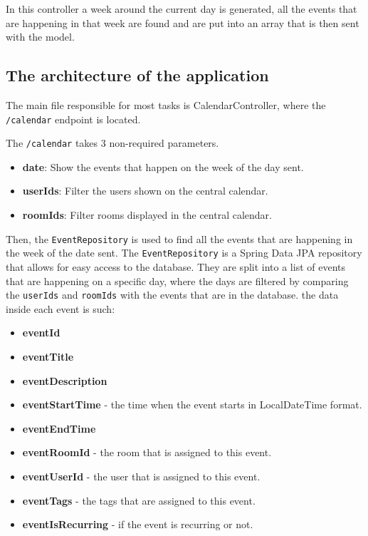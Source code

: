In this controller a week around the current day is generated, all the events that are happening in that week are found and are put into an array that is then sent with the model.




\newpage%

\subsection{The architecture of the application}\label{subsec:the-architecture-of-the-application}

The main file responsible for most tasks is CalendarController, where the \texttt{/calendar} endpoint is located.

The \texttt{/calendar} takes 3 non-required parameters.
\begin{itemize}
    \item \textbf{date}: Show the events that happen on the week of the day sent.
    \item \textbf{userIds}: Filter the users shown on the central calendar.
    \item \textbf{roomIds}: Filter rooms displayed in the central calendar.
\end{itemize}
Then, the \texttt{EventRepository} is used to find all the events that are happening in the week of the date sent.
The \texttt{EventRepository} is a Spring Data JPA repository that allows for easy access to the database.
They are split into a list of events that are happening on a specific day, where the days are filtered by comparing the \texttt{userIds} and \texttt{roomIds} with the events that are in the database.
the data inside each event is such:
\begin{itemize}
    \item \textbf{eventId}
    \item \textbf{eventTitle}
    \item \textbf{eventDescription}
    \item \textbf{eventStartTime} - the time when the event starts in LocalDateTime format.
    \item \textbf{eventEndTime}
    \item \textbf{eventRoomId} - the room that is assigned to this event.
    \item \textbf{eventUserId} - the user that is assigned to this event.
    \item \textbf{eventTags} - the tags that are assigned to this event.
    \item \textbf{eventIsRecurring} - if the event is recurring or not.
\end{itemize}
